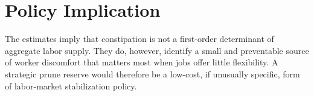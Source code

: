 \documentclass[12pt]{article}
\begin{document}
\section{Policy Implication}

The estimates imply that constipation is not a first-order determinant of aggregate labor supply. They do, however, identify a small and preventable source of worker discomfort that matters most when jobs offer little flexibility. A strategic prune reserve would therefore be a low-cost, if unusually specific, form of labor-market stabilization policy.

\fi
\end{document}

